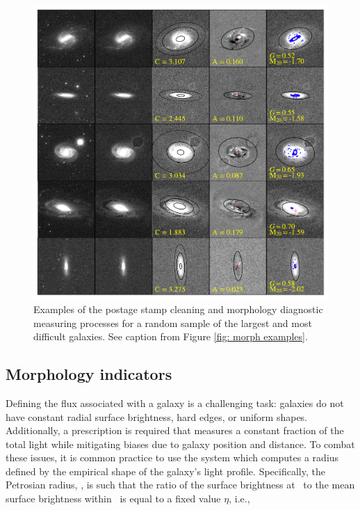 \begin{figure}
\includegraphics[width=\textwidth]{Figures/measure_morph_hardest.pdf}
\caption[Examples of image cleaning and morphology diagnostic measurements]{Examples of the postage stamp cleaning and morphology diagnostic measuring processes for a random sample of the largest and most difficult galaxies. See caption from Figure \ref{fig: morph examples}.}
\label{fig: morph examples hardest}
\end{figure}


\subsection{Morphology indicators}

Defining the flux associated with a galaxy is a challenging task: galaxies do not have constant radial surface brightness, hard edges, or uniform shapes.  Additionally, a prescription is required that measures a constant fraction of the total light while mitigating biases due to galaxy position and distance.  To combat these issues, it is common practice to use the \cite{Petrosian1976} system which computes a radius defined by the empirical shape of the galaxy's light profile. Specifically, the Petrosian radius, \rp, is such that the ratio of the surface brightness at \rp~to the mean surface brightness within \rp~is equal to a fixed value $\eta$, i.e., 

